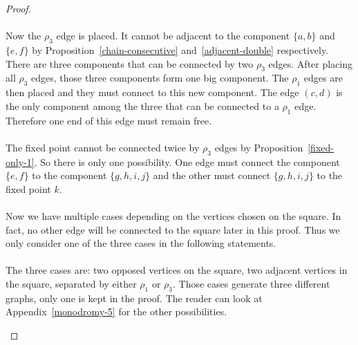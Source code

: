 \begin{proof}
\paragraph{}
Now the $\rho_3$ edge is placed. It cannot be adjacent to the component $\{a,b\}$ and $\{e,f\}$ by Proposition~\ref{chain-consecutive} and~\ref{adjacent-double} respectively. There are three components that can be connected by two $\rho_3$ edges. After placing all $\rho_3$ edges, those three components form one big component. The $\rho_1$ edges are then placed and they must connect to this new component. The edge $(c,d)$ is the only component among the three that can be connected to a $\rho_1$ edge. Therefore one end of this edge must remain free.

\paragraph{}
The fixed point cannot be connected twice by $\rho_3$ edges by Proposition~\ref{fixed-only-1}. So there is only one possibility. One edge must connect the component $\{e,f\}$ to the component $\{g,h,i,j\}$ and the other must connect $\{g,h,i,j\}$ to the fixed point $k$.

\paragraph{}
Now we have multiple cases depending on the vertices chosen on the square. In fact, no other edge will be connected to the square later in this proof. Thus we only consider one of the three cases in the following statements.

\paragraph{}
The three cases are: two opposed vertices on the square, two adjacent vertices in the square, separated by either $\rho_1$ or $\rho_3$. Those cases generate three different graphs, only one is kept in the proof. The reader can look at Appendix~\ref{monodromy-5} for the other possibilities.

\begin{figure}[H]
  \begin{center}
\end{center}
\end{figure}
\end{proof}
